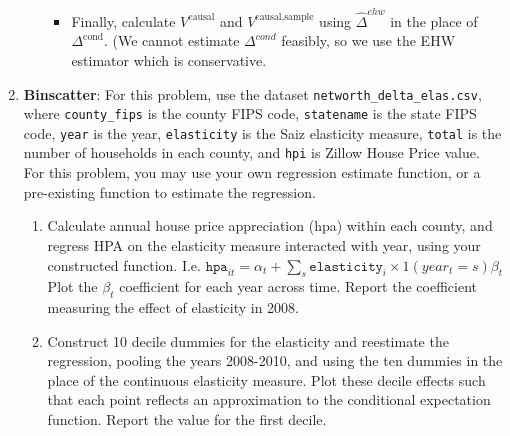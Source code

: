 \documentclass[11pt, a4paper]{article}
\begin{document}
\begin{enumerate}
\begin{enumerate}
\begin{itemize}
    \item Finally, calculate $V^{\text{causal}}$ and $V^{\text{causal,sample}}$ using $\hat{\Delta}^{ehw}$ in the place of $\Delta^{\text{cond}}$. (We cannot estimate $\Delta^{cond}$ feasibly, so we use the EHW estimator which is conservative.
    \end{itemize}
  \end{enumerate}
\item \textbf{Binscatter}: For this problem, use the dataset
  \texttt{networth\_delta\_elas.csv}, where \texttt{county\_fips} is
  the county FIPS code, \texttt{statename} is the state FIPS code,
  \texttt{year} is the year, \texttt{elasticity} is the Saiz
  elasticity measure, \texttt\texttt{total} is the number of
  households in each county, and \texttt{hpi} is Zillow House Price
  value. For this problem, you may use your own regression estimate
  function, or a pre-existing function to estimate the regression.
  \begin{enumerate}
  \item Calculate annual house price appreciation (hpa) within each county, and regress HPA on the elasticity measure interacted with year, using your constructed function. I.e. $\texttt{hpa}_{it} = \alpha_{t} + \sum_{s}\texttt{elasticity}_{i}\times 1(year_{t} = s)\beta_{t}$ Plot the $\beta_{t}$ coefficient for each year across time. Report the coefficient measuring the effect of elasticity in 2008.
  \item Construct 10 decile dummies for the elasticity and reestimate the regression, pooling the years 2008-2010, and using the ten dummies in the place of the continuous elasticity measure. Plot these decile effects such that each point reflects an approximation to the conditional expectation function. Report the value for the first decile.
  \end{enumerate}
\end{enumerate}
\end{document}
